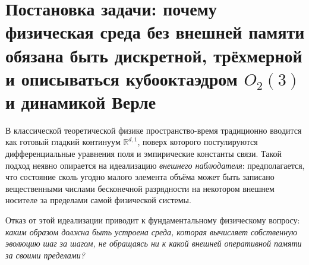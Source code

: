 \documentclass[11pt,a4paper]{article}
\theoremstyle{plain}
\theoremstyle{definition}
\begin{document}
\begin{abstract}
\medskip\noindent
\textbf{Ключевые слова:} дискретный планковский носитель, теория моделей Мальцева, уравнение Каталана $1+2^d=d^2$, кубооктаэдр $O_2(3)$, симплектический автомат Верле, правило Борна, постоянная тонкой структуры, Lean~4.
\end{abstract}

\section{Постановка задачи: почему физическая среда без внешней памяти обязана быть дискретной, трёхмерной и описываться кубооктаэдром \texorpdfstring{$O_2(3)$}{O2(3)} и динамикой Верле}
\label{sec:axioms-uniqueness}

В классической теоретической физике пространство-время традиционно вводится как готовый гладкий континуум $\mathbb{R}^{d,1}$, поверх которого постулируются дифференциальные уравнения поля и эмпирические константы связи. Такой подход неявно опирается на идеализацию \emph{внешнего наблюдателя}: предполагается, что состояние сколь угодно малого элемента объёма может быть записано вещественными числами бесконечной разрядности на некотором внешнем носителе за пределами самой физической системы.

Отказ от этой идеализации приводит к фундаментальному физическому вопросу: \emph{каким образом должна быть устроена среда, которая вычисляет собственную эволюцию шаг за шагом, не обращаясь ни к какой внешней оперативной памяти за своими пределами?}
\end{document}
